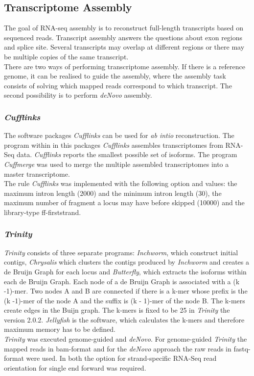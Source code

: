 \documentclass[12pt, a4paper]{report}
\begin{document}
\subsection*{Transcriptome Assembly}
The goal of RNA-seq assembly is to reconstruct full-length transcripts based on sequenced reads. Transcript assembly answers the questions about exon regions and splice site. Several transcripts may overlap at different regions or there may be multiple copies of the same transcript. \\
There are two ways of performing transcriptome assembly. If there is a reference genome, it can be realised to guide the assembly, where the assembly task consists of solving which mapped reads correspond to which transcript. The second possibility is to perform \textit{deNovo} assembly. \cite{Korpelainen2014} 

\subsubsection*{\textit{Cufflinks}}
The software packages \textit{Cufflinks} can be used for \textit{ab intio} reconstruction. The program within in this packages \textit{Cufflinks} assembles transcriptomes from RNA-Seq data. \textit{Cufflinks} reports the smallest possible set of isoforms. The program \textit{Cuffmerge} was used to merge the multiple assembled transcriptomes into a master transcriptome. \cite{Trapnell2010} \\
The rule \textit{Cufflinks} was implemented with the following option and values: the maximum intron length (2000) and the minimum intron length (30), the maximum number of fragment a locus may have before skipped (10000) and the library-type ff-firststrand.

\subsubsection*{\textit{Trinity}}
\textit{Trinity} consists of three separate programs: \textit{Inchworm}, which construct initial contigs, \textit{Chrysalis} which clusters the contigs produced by \textit{Inchworm} and creates a de Bruijn Graph for each locus and \textit{Butterfly}, which extracts the isoforms within each de Bruijn Graph. 
Each node of a de Bruijn Graph is associated with a (k -1)-mer. Two nodes A and B are connected if there is a k-mer whose prefix is the (k -1)-mer of the node A and the suffix is (k - 1)-mer of the node B. The k-mers create edges in the Buijn graph. \cite{Korpelainen2014} The k-mers is fixed to be 25 in \textit{Trinity} the version 2.0.2.
\textit{Jellyfish} is the software, which calculates the k-mers and therefore maximum memory has to be defined. \cite{Grabherr2013}
\ \\
\textit{Trinity} was executed genome-guided and \textit{deNovo}. For genome-guided \textit{Trinity} the mapped reads in bam-format and for the \textit{deNovo} approach the raw reads in fastq-format were used. In both the option for strand-specific RNA-Seq read orientation for single end forward was required. 
\end{document}
